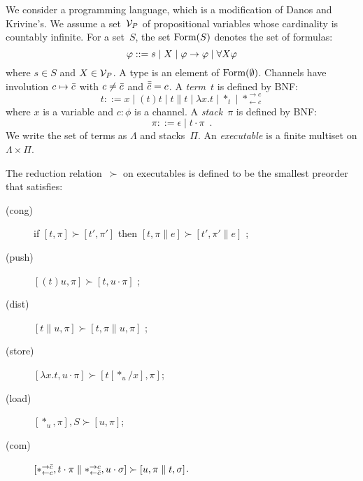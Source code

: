 
\newcommand{\conc}{\parallel}
\newcommand{\comod}[2]{\ast^{\rightarrow {#2}}_{\leftarrow{#1}}}
\newcommand{\reader}[1]{\ast_{\leftarrow{#1}}}

We consider a programming language, which is a modification of
Danos and Krivine's.
We assume a set~$\mathcal V_P$ of propositional variables whose cardinality is
countably infinite.
For a set~$S$,
the set $\mathop{\text{Form}}(S)$ denotes the set of formulas:
\[
\varphi::= s \mid X \mid \varphi\rightarrow\varphi\mid \forall X \varphi
\]
where $s\in S$ and $X\in \mathcal V_P$.
A type is an element of $\mathop{\text{Form}}(\emptyset)$.
Channels have involution $c\mapsto\bar{c}$ with
$c\neq \bar{c}$ and
$\bar{\bar{c}} = c$.
A \textit{term}~$t$ is defined by BNF:
\[
 t::= x
 \mid (t)t
 \mid t\conc t
 \mid \lambda x.t
 \mid \ast_t
 \mid \comod c c
\]
where $x$ is a variable and $c\colon\phi$ is a channel.
A \textit{stack}~$\pi$ is defined by BNF:
\[
 \pi ::= \epsilon
 \mid t\cdot \pi
 \enspace.
\]
We write the set of terms as $\Lambda$ and stacks~$\Pi$.
An \textit{executable} is a finite multiset on $\Lambda \times \Pi$.

\newcommand{\red}{\succ}
The reduction relation~$\red$ on executables
is defined to be the smallest preorder
that satisfies:
\begin{description}
 \item[(cong)] if
	    $[t,\pi]         \red [ t',\pi']$
	    then
	    $[t,\pi \conc e] \red [ t',\pi'\conc e]$  \enspace;
 \item[(push)]
	    $[(t)u,\pi]      \red [t,u\cdot\pi]$      \enspace;
 \item[(dist)]
	    $[t\conc u,\pi]  \red [t,\pi\conc u,\pi]$ \enspace;
 \item[(store)]
	    $[\lambda x.t,u\cdot\pi]
	     \red
	     [t[\ast_u/x],      \pi]$\enspace;
 \item[(load)]
	    $[\ast_u,\pi],S\red[u,\pi]$\enspace;
 \item[(com)]
	    $[\comod c{\co c}, t\cdot\pi\conc \comod{\co c}c,
	    u\cdot\sigma] \red
	    [u,\pi\conc t,\sigma]$\enspace.
\end{description}

